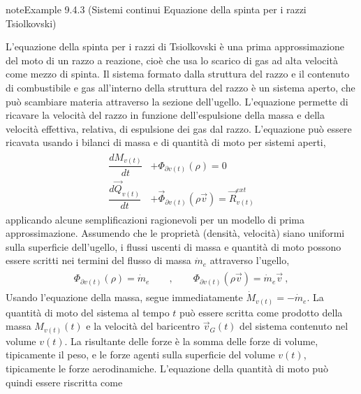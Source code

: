 \documentclass[letterpaper,10pt,italian]{jupyterBook}
\begin{document}
\begin{sphinxadmonition}{note}{Example 9.4.3 (Sistemi continui \sphinxhyphen{} Equazione della spinta per i razzi \sphinxhyphen{} Tsiolkovski)}



\sphinxAtStartPar
L’equazione della spinta per i razzi \sphinxhyphen{} di Tsiolkovski   \sphinxhyphen{} è una prima approssimazione del moto di un razzo a reazione, cioè che usa lo scarico di gas ad alta velocità come mezzo di spinta. Il sistema formato dalla struttura del razzo e il contenuto di combustibile e gas all’interno della struttura del razzo è un sistema aperto, che può scambiare materia attraverso la sezione dell’ugello. L’equazione permette di ricavare la velocità del razzo in funzione dell’espulsione della massa e della velocità effettiva, relativa, di espulsione dei gas dal razzo. L’equazione può essere ricavata usando i bilanci di massa e di quantità di moto per sistemi aperti,
\begin{equation*}
\begin{split}\begin{aligned}
  \dfrac{d M_{v(t)}}{dt} & + \Phi_{\partial v(t)}(\rho) = 0 \\
  \dfrac{d \vec{Q}_{v(t)}}{dt} & + \vec{\Phi}_{\partial v(t)}(\rho \vec{v}) = \vec{R}_{v(t)}^{ext}
\end{aligned}\end{split}
\end{equation*}
\sphinxAtStartPar
applicando alcune semplificazioni ragionevoli per un modello di prima approssimazione. Assumendo che le proprietà (densità, velocità) siano uniformi sulla superficie dell’ugello, i flussi uscenti di massa e quantità di moto possono essere scritti nei termini del flusso di massa \(\dot{m}_e\) attraverso l’ugello,
\begin{equation*}
\begin{split}\begin{aligned}
  \Phi_{\partial v(t)}(\rho) = \dot{m}_e \qquad , \qquad \Phi_{\partial v(t)}(\rho \vec{v}) = \dot{m}_e \vec{v} \ ,
\end{aligned}\end{split}
\end{equation*}
\sphinxAtStartPar
Usando l’equazione della massa, segue immediatamente \(\dot{M}_{v(t)} = - \dot{m}_e\).
La quantità di moto del sistema al tempo \(t\) può essere scritta come prodotto della massa \(M_{v(t)}(t)\) e la velocità del baricentro \(\vec{v}_G(t)\) del sistema contenuto nel volume \(v(t)\). La risultante delle forze è la somma delle forze di volume, tipicamente il peso, e le forze agenti sulla superficie del volume \(v(t)\), tipicamente le forze aerodinamiche. L’equazione della quantità di moto può quindi essere riscritta come

\end{sphinxadmonition}
\end{document}
